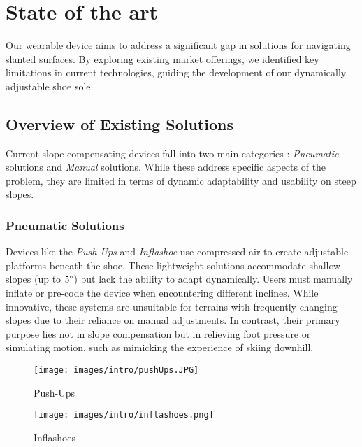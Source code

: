 \documentclass[lettersize,journal]{IEEEtran}
\begin{document}


\section{State of the art}

Our wearable device aims to address a significant gap in solutions for navigating slanted surfaces. By exploring existing market offerings, we identified key limitations in current technologies, guiding the development of our dynamically adjustable shoe sole.

\subsection{Overview of Existing Solutions}

Current slope-compensating devices fall into two main categories : \textit{Pneumatic} solutions and \textit{Manual} solutions. While these address specific aspects of the problem, they are limited in terms of dynamic adaptability and usability on steep slopes.

\medskip \subsubsection{Pneumatic Solutions } \textcolor{magenta}{}

Devices like the \textit{Push-Ups} \cite{ref2} and \textit{Inflashoe} \cite{ref3} use compressed air to create adjustable platforms beneath the shoe. These lightweight solutions accommodate shallow slopes (up to $5\degree$) but lack the ability to adapt dynamically. Users must manually inflate or pre-code the device when encountering different inclines. While innovative, these systems are unsuitable for terrains with frequently changing slopes due to their reliance on manual adjustments. In contrast, their primary purpose lies not in slope compensation but in relieving foot pressure or simulating motion, such as mimicking the experience of skiing downhill.

\begin{figure}[!ht]
\begin{minipage}[c]{0.45\linewidth}
    \centering
    \texttt{[image: images/intro/pushUps.JPG]}
    \caption{Push-Ups}
    \label{pushups}
\end{minipage}
\hfill
\begin{minipage}[c]{0.45\linewidth}
    \centering
    \texttt{[image: images/intro/inflashoes.png]}
    \caption{Inflashoes}
    \label{inflashoes}
\end{minipage}
\end{figure}
\end{document}
